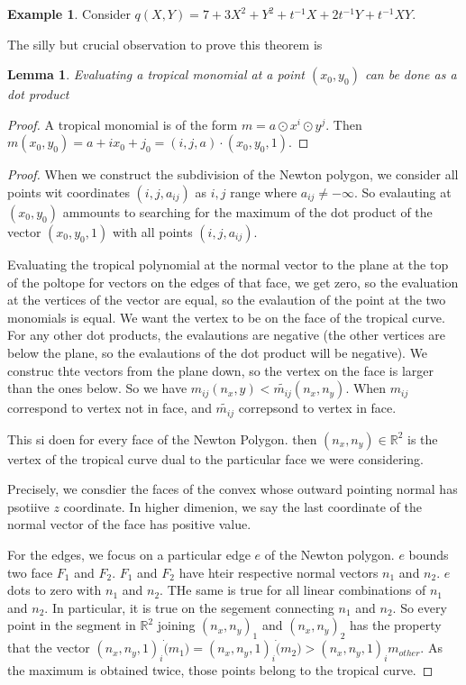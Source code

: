 \documentclass[12pt]{memoir}
\newtheorem{protolemma}[prototheorem]{Lemma}
\newenvironment{lemma}
   {\begin{protolemma}}
   {\end{protolemma}}
\theoremstyle{definition}
\newtheorem{protoexample}{Example}[section]
\newenvironment{ex}
   {\begin{protoexample}}
   {\end{protoexample}}
\def\RR{{\mathbb R}}
\begin{document}
\begin{ex}
    Consider $q(X,Y) = 7+3X^2+Y^2+t^{-1}X + 2t^{-1}Y + t^{-1}XY$.
\end{ex}


The silly but crucial observation to prove this theorem is

\begin{lemma}
    Evaluating a tropical monomial at a point $(x_0,y_0)$ can be done as a dot product
\end{lemma}
\begin{proof}
    A tropical monomial is of the form $m=a\odot x^i \odot y^j$. Then $m(x_0,y_0) = a + ix_0 +j_0 = (i,j,a)\cdot(x_0,y_0,1)$.
\end{proof}


\begin{proof}

When we construct the subdivision of the Newton polygon, we consider all points wit coordinates $(i,j,a_{ij})$ as $i,j$ range where $a_{ij} \neq -\infty$. So evalauting at $(x_0,y_0)$ ammounts to searching for the maximum of the dot product of the vector $(x_0,y_0,1)$ with all points $(i,j,a_{ij})$.


Evaluating the tropical polynomial at the normal vector to the plane at the top of the poltope for vectors on the edges of that face, we get zero, so the evaluation at the vertices of the vector are equal, so the evalaution of the point at the two monomials is equal. We want the vertex to be on the face of the tropical curve. For any other dot products, the evalautions are negative (the other vertices are below the plane, so the evalautions of the dot product will be negative). We construc thte vectors from the plane down, so the vertex on the face is larger than the ones below.  So we have $m_{ij}(n_x,y) <\tilde{m_{ij}}(n_x,n_y)$. When $m_{ij}$ correspond to vertex not in face, and $\tilde{m_{ij}}$ correpsond to vertex in face.



This si doen for every face of the Newton Polygon. then $(n_x,n_y) \in \RR^2$ is the vertex of the tropical curve dual to the particular face we were considering.




Precisely, we consdier the faces of the convex whose outward pointing normal has psotiive $z$ coordinate. In higher dimenion, we say the last coordinate of the normal vector of the face has positive value.

    
For the edges, we focus on a particular edge $e$ of the Newton polygon. $e$ bounds two face $F_1$ and $F_2$. $F_1$ and $F_2$ have hteir respective normal vectors $n_1$ and $n_2$. $e$ dots to zero with $n_1$ and $n_2$. THe same is true for all linear combinations of $n_1$ and $n_2$. In particular, it is true on the segement connecting $n_1$ and $n_2$. So every point in the segment in $\RR^2$ joining $(n_x,n_y)_1$ and $(n_x,n_y)_2$ has the property that the vector $(n_x,n_y,1)_i \dot (m_1)=(n_x,n_y,1)_i \dot (m_2) > (n_x,n_y,1)_i m_{other}$. As the maximum is obtained twice, those points belong to the tropical curve.

\end{proof}
\end{document}
